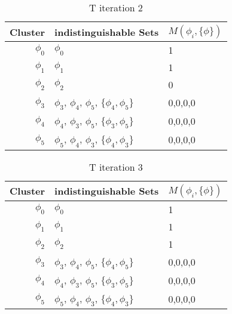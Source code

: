 \documentclass{article}
\begin{document}
				\begin{table}[h!]
				  \begin{center}
				    \caption{T iteration 2}
				    \label{tab:table4}
				    \begin{tabular}{r|l|l}
				      Cluster & indistinguishable Sets & $M(\phi_i, \{\phi\})$\\
				      \hline
				      $\phi_0$ & $\phi_0$ & 1\\
				      $\phi_1$ & $\phi_1$ & 1\\
				      $\phi_2$ & $\phi_2$ & 0\\
				      $\phi_3$ & $\phi_3$, $\phi_4$, $\phi_5$, $\{\phi_4,\phi_5\}$ & 0,0,0,0\\
				      $\phi_4$ & $\phi_4$, $\phi_3$, $\phi_5$, $\{\phi_3,\phi_5\}$ & 0,0,0,0\\
				      $\phi_5$ & $\phi_5$, $\phi_4$, $\phi_3$, $\{\phi_4,\phi_3\}$ & 0,0,0,0\\
				    \end{tabular}
				  \end{center}
				\end{table}

				\begin{table}[h!]
				  \begin{center}
				    \caption{T iteration 3}
				    \label{tab:table5}
				    \begin{tabular}{r|l|l}
				      Cluster & indistinguishable Sets & $M(\phi_i, \{\phi\})$\\
				      \hline
				      $\phi_0$ & $\phi_0$ & 1\\
				      $\phi_1$ & $\phi_1$ & 1\\
				      $\phi_2$ & $\phi_2$ & 1\\
				      $\phi_3$ & $\phi_3$, $\phi_4$, $\phi_5$, $\{\phi_4,\phi_5\}$ & 0,0,0,0\\
				      $\phi_4$ & $\phi_4$, $\phi_3$, $\phi_5$, $\{\phi_3,\phi_5\}$ & 0,0,0,0\\
				      $\phi_5$ & $\phi_5$, $\phi_4$, $\phi_3$, $\{\phi_4,\phi_3\}$ & 0,0,0,0\\
				    \end{tabular}
				  \end{center}
				\end{table}
\end{document}
